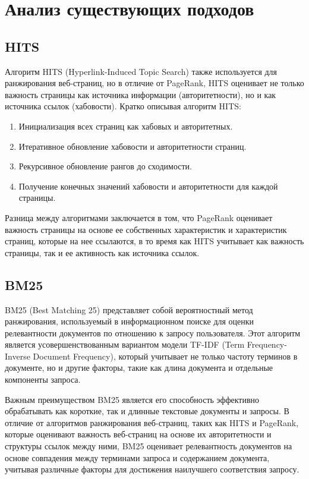 \documentclass[a4paper]{article}
\begin{document}
	\newpage
	\section{Анализ существующих подходов}
	
	\subsection{HITS}
	
Алгоритм HITS (Hyperlink-Induced Topic Search) также используется для ранжирования веб-страниц, но в отличие от PageRank, HITS оценивает не только важность страницы как источника информации (авторитетности), но и как источника ссылок (хабовости). Кратко описывая алгоритм HITS:

\begin{enumerate}
	\item Инициализация всех страниц как хабовых и авторитетных.
	\item Итеративное обновление хабовости и авторитетности страниц.
	\item Рекурсивное обновление рангов до сходимости.
	\item Получение конечных значений хабовости и авторитетности для каждой страницы.
\end{enumerate}

Разница между алгоритмами заключается в том, что PageRank оценивает важность страницы на основе ее собственных характеристик и характеристик страниц, которые на нее ссылаются, в то время как HITS учитывает как важность страницы, так и ее активность как источника ссылок.

	\subsection{BM25}
	
BM25 (Best Matching 25) представляет собой вероятностный метод ранжирования, используемый в информационном поиске для оценки релевантности документов по отношению к запросу пользователя. Этот алгоритм является усовершенствованным вариантом модели TF-IDF (Term Frequency-Inverse Document Frequency), который учитывает не только частоту терминов в документе, но и другие факторы, такие как длина документа и отдельные компоненты запроса.

Важным преимуществом BM25 является его способность эффективно обрабатывать как короткие, так и длинные текстовые документы и запросы. В отличие от алгоритмов ранжирования веб-страниц, таких как HITS и PageRank, которые оценивают важность веб-страниц на основе их авторитетности и структуры ссылок между ними, BM25 оценивает релевантность документов на основе совпадения между терминами запроса и содержанием документа, учитывая различные факторы для достижения наилучшего соответствия запросу.
	\newpage
\end{document}
